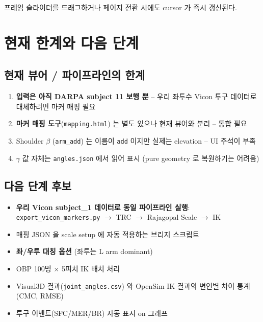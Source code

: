 \documentclass[11pt, a4paper]{report}
\begin{document}
프레임 슬라이더를 드래그하거나 페이지 전환 시에도 cursor 가 즉시 갱신된다.


\chapter{현재 한계와 다음 단계}

\section{현재 뷰어 / 파이프라인의 한계}

\begin{enumerate}
  \item \textbf{입력은 아직 DARPA subject 11 보행 뿐} -- 우리 좌투수
    Vicon 투구 데이터로 대체하려면 마커 매핑 필요
  \item \textbf{마커 매핑 도구}(\texttt{mapping.html}) 는 별도 있으나
    현재 뷰어와 분리 -- 통합 필요
  \item Shoulder $\beta$ (\texttt{arm\_add}) 는 이름이 \texttt{add} 이지만
    실제는 elevation -- UI 주석이 부족
  \item $\gamma$ 값 자체는 \texttt{angles.json} 에서 읽어 표시 (pure
    geometry 로 복원하기는 어려움)
\end{enumerate}

\section{다음 단계 후보}

\begin{tcolorbox}[colback=thmgreen!5, colframe=thmgreen!60, title=Short-term]
\begin{itemize}
  \item \textbf{우리 Vicon subject\_1 데이터로 동일 파이프라인 실행}:
    \texttt{export\_vicon\_markers.py} $\to$ TRC $\to$ Rajagopal Scale $\to$ IK
  \item 매핑 JSON 을 scale setup 에 자동 적용하는 브리지 스크립트
  \item \textbf{좌/우투 대칭 옵션} (좌투는 L arm dominant)
\end{itemize}
\end{tcolorbox}

\begin{tcolorbox}[colback=defblue!5, colframe=defblue!60, title=Mid-term]
\begin{itemize}
  \item OBP 100명 × 5피치 IK 배치 처리
  \item Visual3D 결과(\texttt{joint\_angles.csv}) 와 OpenSim IK 결과의
    변인별 차이 통계(CMC, RMSE)
  \item 투구 이벤트(SFC/MER/BR) 자동 표시 on 그래프
\end{itemize}
\end{tcolorbox}
\end{document}
